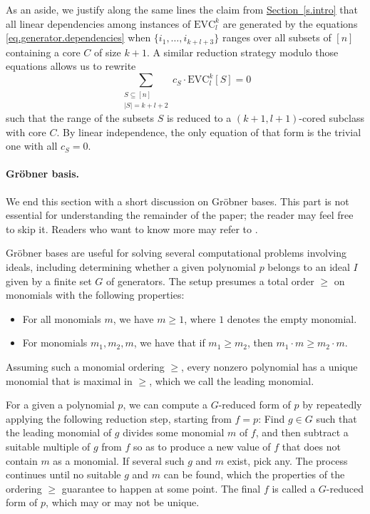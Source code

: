 \documentclass[11pt]{article}
\numberwithin{equation}{section}
\theoremstyle{definition}
\theoremstyle{plain}
\newcommand{\expref}[2]{\hyperref[#2]{#1~\ref{#2}}}
\newcommand{\VanGen}{{\ensuremath{\mathrm{EVC}}}}
\newcommand{\VanGenparam}[2]{{\ensuremath{\VanGen^{#1}_{#2}}}}
\newcommand{\VanGenkl}{\VanGenparam{k}{l}}
\begin{document}
As an aside, we justify along the same lines the claim from  \expref{Section}{s.intro} that all linear dependencies among instances of $\VanGenkl$ are generated by the equations \eqref{eq.generator.dependencies} when $\{i_1, \dots, i_{k+l+3}\}$ ranges over all subsets of $[n]$ containing a core $C$ of size $k+1$. A similar reduction strategy modulo those equations allows us to rewrite 
\[
\sum_{\substack{S \subseteq [n] \\ |S|=k+l+2}} c_S \cdot  \VanGenkl[S] = 0
\]
such that the range of the subsets $S$ is reduced to a $(k+1,l+1)$-cored subclass with core $C$. By linear independence, the only equation of that form is the trivial one with all $c_S=0$.

\paragraph{Gr\"obner basis.} We end this section with a short discussion on Gr\"obner bases. This part is not essential for understanding the remainder of the paper; the reader may feel free to skip it. Readers who want to know more may refer to \cite{AL1994,CLO2013}.

Gr\"obner bases are useful for solving several computational problems involving ideals, including determining whether a given polynomial $p$ belongs to an ideal $I$ given by a finite set $G$ of generators. The setup presumes a total order $\ge$ on monomials with the following properties:
\begin{itemize}
    \item For all monomials $m$, we have $m \ge 1$, where $1$ denotes the empty monomial.
    \item For monomials $m_1,m_2,m$, we have that if $m_1\ge m_2$, then $m_1\cdot m \ge m_2\cdot m$.
\end{itemize}
Assuming such a monomial ordering $\ge$, every nonzero polynomial has a unique monomial that is maximal in $\ge$, which we call the leading monomial. 

For a given a polynomial $p$, we can compute a $G$-reduced form of $p$ by repeatedly applying the following reduction step, starting from $f=p$: Find $g\in G$ such that the leading monomial of $g$ divides some monomial $m$ of $f$, and then subtract a suitable multiple of $g$ from $f$ so as to produce a new value of $f$ that does not contain $m$ as a monomial. If several such $g$ and $m$ exist, pick any. The process continues until no suitable $g$ and $m$ can be found, which the properties of the ordering $\ge$ guarantee to happen at some point. The final $f$ is called a $G$-reduced form of $p$, which may or may not be unique.
\end{document}
